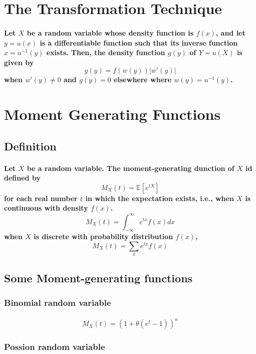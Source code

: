 \documentclass[titlepage]{article}
\begin{document}
    \section{The Transformation Technique}
        \paragraph{
            Let $X$ be a random variable whose density function is $f(x)$, and let $y=u(x)$ is a differentiable function such that its inverse function $x=u^{-1}(y)$ exists. Then, the density function $g(y)$ of $Y=u(X)$ is given by 
            $$g(y)=f(w(y))|w'(y)|$$ when $w'(y)\neq 0$ 
            and $g(y)=0$ elsewhere where $w(y)=u^{-1}(y)$.
        }
    \section{Moment Generating Functions}
        \subsection*{Definition}
            \paragraph{
                Let $X$ be a random variable. The moment-generating dunction of $X$ id defined by 
                $$M_X(t)=\mathbb{E}[e^{tX}]$$
                for each real number $t$ in which the expectation exists, i.e., when $X$ is continuous with density $f(x)$.
                $$M_X(t)=\int_{-\infty}^\infty e^{tx}f(x)dx$$
                when $X$ is discrete with probability distribution $f(x)$,
                $$M_X(t)=\sum_xe^{tx}f(x)$$
            }
        \subsection{Some Moment-generating functions}
        \subsubsection{Binomial random variable}
            \paragraph{
                $$M_X(t)=(1+\theta(e^t-1))^n$$
            }
        \subsubsection{Possion random variable}
\end{document}
